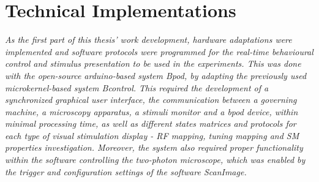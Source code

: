 
\chapter{Technical Implementations}
\label{cap:TechnicalImplementations}

\textit{As the first part of this thesis' work development, hardware adaptations were implemented and software protocols were programmed for the real-time behavioural control and stimulus presentation to be used in the experiments. This was done with the open-source arduino-based system Bpod, by adapting the previously used microkernel-based system Bcontrol. This required the development of a synchronized graphical user interface, the communication between a governing machine, a microscopy apparatus, a stimuli monitor and a bpod device, within minimal processing time, as well as different states matrices and protocols for each type of visual stimulation display - RF mapping, tuning mapping and SM properties investigation.
Moreover, the system also required proper functionality within the software controlling the two-photon microscope, which was enabled by the trigger and configuration settings of the software ScanImage.}




%
%
%
\cleardoublepage
